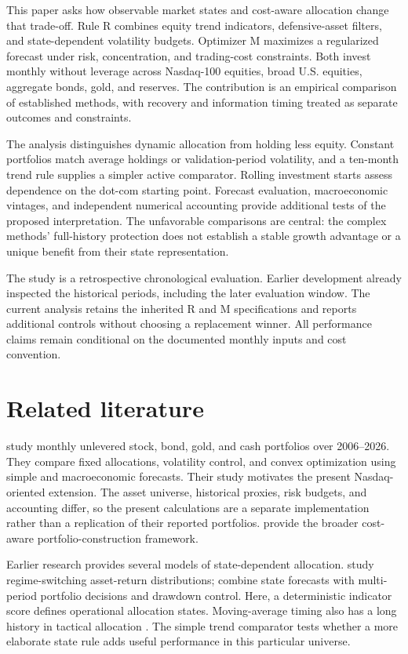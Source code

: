 \documentclass[12pt,letterpaper]{article}
\begin{document}
This paper asks how observable market states and cost-aware allocation change that trade-off. Rule R combines equity trend indicators, defensive-asset filters, and state-dependent volatility budgets. Optimizer M maximizes a regularized forecast under risk, concentration, and trading-cost constraints. Both invest monthly without leverage across Nasdaq-100 equities, broad U.S. equities, aggregate bonds, gold, and reserves. The contribution is an empirical comparison of established methods, with recovery and information timing treated as separate outcomes and constraints.

The analysis distinguishes dynamic allocation from holding less equity. Constant portfolios match average holdings or validation-period volatility, and a ten-month trend rule supplies a simpler active comparator. Rolling investment starts assess dependence on the dot-com starting point. Forecast evaluation, macroeconomic vintages, and independent numerical accounting provide additional tests of the proposed interpretation. The unfavorable comparisons are central: the complex methods' full-history protection does not establish a stable growth advantage or a unique benefit from their state representation.

The study is a retrospective chronological evaluation. Earlier development already inspected the historical periods, including the later evaluation window. The current analysis retains the inherited R and M specifications and reports additional controls without choosing a replacement winner. All performance claims remain conditional on the documented monthly inputs and cost convention.

\section{Related literature}
\citet{devanathan2026} study monthly unlevered stock, bond, gold, and cash portfolios over 2006--2026. They compare fixed allocations, volatility control, and convex optimization using simple and macroeconomic forecasts. Their study motivates the present Nasdaq-oriented extension. The asset universe, historical proxies, risk budgets, and accounting differ, so the present calculations are a separate implementation rather than a replication of their reported portfolios. \citet{boyd2024} provide the broader cost-aware portfolio-construction framework.

Earlier research provides several models of state-dependent allocation. \citet{guidolin2007} study regime-switching asset-return distributions; \citet{nystrup2019} combine state forecasts with multi-period portfolio decisions and drawdown control. Here, a deterministic indicator score defines operational allocation states. Moving-average timing also has a long history in tactical allocation \citep{faber2007}. The simple trend comparator tests whether a more elaborate state rule adds useful performance in this particular universe.
\end{document}
